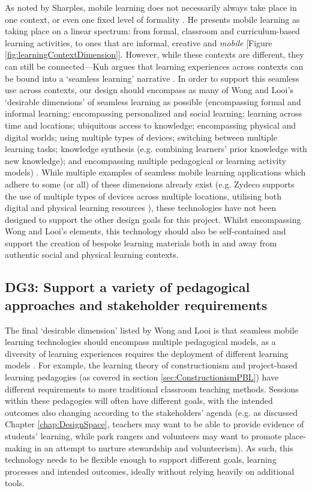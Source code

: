 As noted by Sharples, mobile learning does not necessarily always take place in one context, or even one fixed level of formality \citep{Sharples2013}. He presents mobile learning as taking place on a linear spectrum: from formal, classroom and curriculum-based learning activities, to ones that are informal, creative and \textit{mobile} [Figure \ref{fig:learningContextDimension}]. However, while these contexts are different, they can still be connected---Kuh argues that learning experiences across contexts can be bound into a `seamless learning' narrative \citep{Kuh1996}. In order to support this seamless use across contexts, our design should encompass as many of Wong and Looi's `desirable dimensions' of seamless learning as possible (encompassing formal and informal learning; encompassing personalized and social learning; learning across time and locations; ubiquitous access to knowledge; encompassing physical and digital worlds; using multiple types of devices; switching between multiple learning tasks; knowledge synthesis (e.g. combining learners’ prior knowledge with new knowledge); and encompassing multiple pedagogical or learning activity models) \citep{Wong2011}. While multiple examples of seamless mobile learning applications which adhere to some (or all) of these dimensions already exist (e.g. Zydeco supports the use of multiple types of devices across multiple locations, utilising both digital and physical learning resources \citep{kuhn2011}), these technologies have not been designed to support the other design goals for this project. Whilst encompassing Wong and Looi's elements, this technology should also be self-contained and support the creation of bespoke learning materials both in and away from authentic social and physical learning contexts.

\subsection*{ DG3: Support a variety of pedagogical approaches and stakeholder requirements }
\label{DG3}

The final `desirable dimension' listed by Wong and Looi is that seamless mobile learning technologies should encompass multiple pedagogical models, as a diversity of learning experiences requires the deployment of different learning models \citep{Wong2011}. For example, the learning theory of constructionism and project-based learning pedagogies (as covered in section \ref{sec:ConstructionismPBL}) have different requirements to more traditional classroom teaching methods. Sessions within these pedagogies will often have different goals, with the intended outcomes also changing according to the stakeholders' agenda (e.g. as discussed Chapter \ref{chap:DesignSpace}, teachers may want to be able to provide evidence of students' learning, while park rangers and volunteers may want to promote place-making in an attempt to nurture stewardship and volunteerism). As such, this technology needs to be flexible enough to support different goals, learning processes and intended outcomes, ideally without relying heavily on additional tools.


